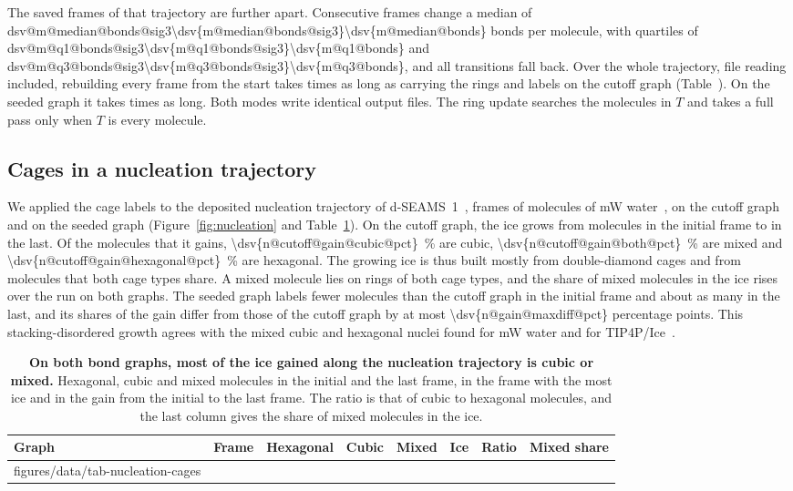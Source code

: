 \documentclass[preprint,12pt]{elsarticle}
\makeatletter
\newcommand{\rthree}[1]{\ifcsname dsv@#1@sig3\endcsname\num{\dsv{#1@sig3}}\else\num[round-mode=figures,round-precision=3]{\dsv{#1}}\fi}
\newcommand{\tabbody}[1]{\@@input #1 }
\makeatother
\begin{document}
The saved frames of that trajectory are further apart.
Consecutive frames change a median of \rthree{m@median@bonds} bonds per molecule, with quartiles of \rthree{m@q1@bonds} and \rthree{m@q3@bonds}, and all  transitions fall back.
Over the whole trajectory, file reading included, rebuilding every frame from the start takes  times as long as carrying the rings and labels on the cutoff graph (Table~).
On the seeded graph it takes  times as long.
Both modes write identical output files.
The ring update searches the molecules in $T$ and takes a full pass only when $T$ is every molecule.

\subsection{Cages in a nucleation trajectory}
\label{sec:nucleation}

We applied the cage labels to the deposited nucleation trajectory of d-SEAMS~1~\cite{goswami2020dseams,goswami2019nucleationdata},  frames of  molecules of mW water~\cite{molinero2009mw}, on the cutoff graph and on the seeded graph (Figure~\ref{fig:nucleation} and Table~\ref{tab:nucleation}).
On the cutoff graph, the ice grows from  molecules in the initial frame to  in the last.
Of the  molecules that it gains, \qty{\dsv{n@cutoff@gain@cubic@pct}}{\percent} are cubic, \qty{\dsv{n@cutoff@gain@both@pct}}{\percent} are mixed and \qty{\dsv{n@cutoff@gain@hexagonal@pct}}{\percent} are hexagonal.
The growing ice is thus built mostly from double-diamond cages and from molecules that both cage types share.
A mixed molecule lies on rings of both cage types, and the share of mixed molecules in the ice rises over the run on both graphs.
The seeded graph labels fewer molecules than the cutoff graph in the initial frame and about as many in the last, and its shares of the gain differ from those of the cutoff graph by at most \num{\dsv{n@gain@maxdiff@pct}} percentage points.
This stacking-disordered growth agrees with the mixed cubic and hexagonal nuclei found for mW water and for TIP4P/Ice~\cite{moore2011structural,lupi2017stacking,haji2015nucleation}.

\begin{table}[tbp]
\centering
\caption{\textbf{On both bond graphs, most of the ice gained along the nucleation trajectory is cubic or mixed.}
Hexagonal, cubic and mixed molecules in the initial and the last frame, in the frame with the most ice and in the gain from the initial to the last frame.
The ratio is that of cubic to hexagonal molecules, and the last column gives the share of mixed molecules in the ice.}
\label{tab:nucleation}
\small
\setlength{\tabcolsep}{3pt}
\begin{tabular}{@{}llrrrrrr@{}}
\toprule
Graph & Frame & Hexagonal & Cubic & Mixed & Ice & Ratio & Mixed share \\
\midrule
\tabbody{figures/data/tab-nucleation-cages}
\bottomrule
\end{tabular}
\end{table}
\end{document}
